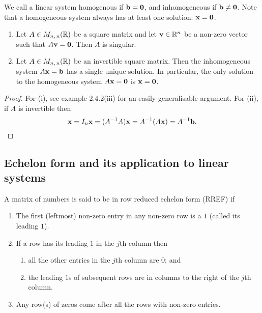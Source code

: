 \documentclass[10pt, a4paper]{article}
\begin{document}
We call a linear system homogenous if $\mathbf{b} = \mathbf{0}$,
and inhomogeneous if $\mathbf{b} \neq \mathbf{0}$.
Note that a homogeneous system always has at least one solution: $\mathbf{x} =\mathbf{0}$.

\begin{lemma}\label{linalg_lem_invprop}\phantom{}
    \begin{enumerate}[label = (\roman*)]
        \item Let $A \in M_{n,\,n}(\mathbb{R})$ be a square matrix and let $\mathbf{v} \in \mathbb{R} ^ n$ be a non-zero vector such that $A\mathbf{v} = \mathbf{0}$. Then $A$ is singular.
        \item Let $A \in M_{n,\,n}(\mathbb{R})$ be an invertible square matrix. Then the inhomogeneous system $A\mathbf{x} = \mathbf{b}$ has a single unique solution. In particular, the only solution to the homogeneous system $A\mathbf{x} = \mathbf{0}$ is $\mathbf{x} = \mathbf{0}$.
    \end{enumerate}
    \begin{proof}
        For (i), see example 2.4.2(iii) for an easily generalisable argument. For (ii), if $A$ is invertible then
        \[
        \mathbf{x} = I_n\mathbf{x} = (A ^ {-1} A)\mathbf{x} = A ^ {-1}(A\mathbf{x}) = A ^ {-1}\mathbf{b}.
        \]
    \end{proof}
\end{lemma}

\subsection{Echelon form and its application to linear systems}

\begin{definition}
    A matrix of numbers is said to be in row reduced echelon form (RREF) if
    \begin{enumerate}[label = (\roman*)]
        \item The first (leftmost) non-zero entry in any non-zero row is a $1$ (called its leading $1$).
        \item If a row has its leading $1$ in the $j$th column then
        \begin{enumerate}[label = (\alph*)]
            \item all the other entries in the $j$th column are $0$; and
            \item the leading $1$s of subsequent rows are in columns to the right of the $j$th column.
        \end{enumerate}
    \item Any row(s) of zeros come after all the rows with non-zero entries.
    \end{enumerate}
\end{definition}
\end{document}
